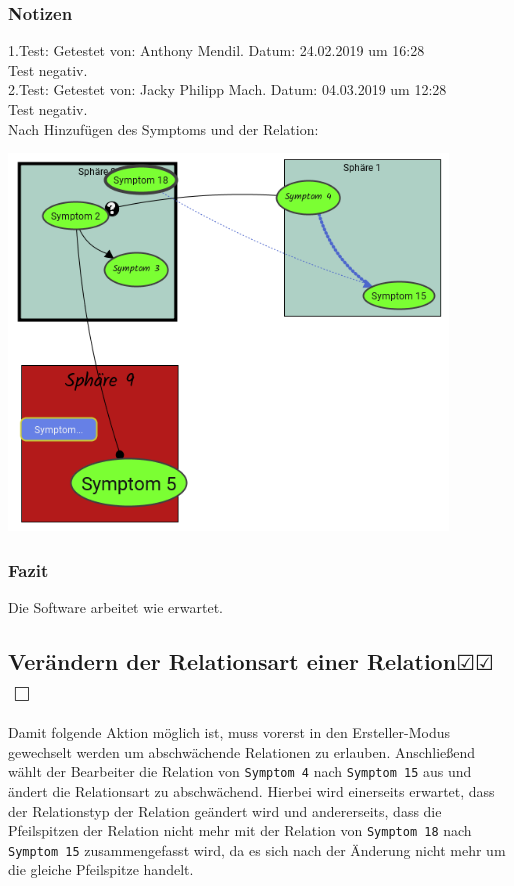 \documentclass[enabledeprecatedfontcommands]{scrartcl}
\newcommand{\subsectiont}[2]{\subsection[#1]{#1{\normalsize\normalfont #2}}}
\newcommand{\leer}{$\Box$}
\newcommand{\ok}{$\CheckedBox$}
\begin{document}
\subsubsection{Notizen}
1.Test: Getestet von: Anthony Mendil. Datum: 24.02.2019 um 16:28 \\
Test negativ. \\
2.Test: Getestet von: Jacky Philipp Mach. Datum: 04.03.2019 um 12:28 \\
Test negativ.\\
Nach Hinzufügen des Symptoms und der Relation: 
\begin{center}
\includegraphics[height=10cm]{3_35.PNG}
\end{center}
\subsubsection{Fazit}
Die Software arbeitet wie erwartet.

\subsectiont{Verändern der Relationsart einer Relation}{\dotfill\ok\ok\leer}
Damit folgende Aktion möglich ist, muss vorerst in den Ersteller-Modus gewechselt werden um abschwächende Relationen zu erlauben. Anschließend wählt der Bearbeiter die Relation von \texttt{Symptom 4} nach \texttt{Symptom 15} aus und ändert die Relationsart zu abschwächend. Hierbei wird einerseits erwartet, dass der Relationstyp der Relation geändert wird und andererseits, dass die Pfeilspitzen der Relation nicht mehr mit der Relation von \texttt{Symptom 18} nach \texttt{Symptom 15} zusammengefasst wird, da es sich nach der Änderung nicht mehr um die gleiche Pfeilspitze handelt.
\end{document}
